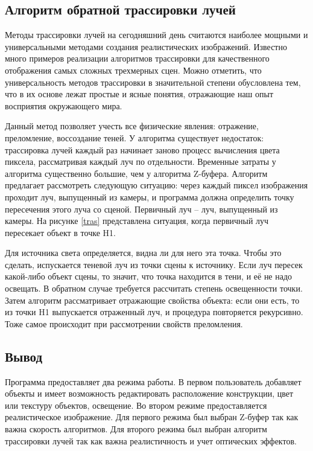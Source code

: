 	\subsection{Алгоритм обратной трассировки лучей}
	Методы трассировки лучей на сегодняшний день считаются наиболее мощными и универсальными методами создания реалистических изображений. Известно много примеров реализации алгоритмов трассировки для качественного отображения самых сложных трехмерных сцен. Можно отметить, что универсальность методов трассировки в значительной степени обусловлена тем, что в их основе лежат простые и ясные понятия, отражающие наш опыт восприятия окружающего мира.
	
	Данный метод позволяет учесть все физические явления: отражение, преломление, воссоздание теней. У алгоритма существует недостаток: трассировка лучей каждый раз начинает заново процесс вычисления цвета пиксела, рассматривая каждый луч по отдельности. Временные затраты у алгоритма существенно большие, чем у алгоритма Z-буфера.
	Алгоритм предлагает рассмотреть следующую ситуацию: через каждый пиксел изображения проходит луч, выпущенный из камеры, и программа должна определить точку пересечения этого луча со сценой. Первичный луч – луч, выпущенный из камеры.
	На рисунке \ref{tras} представлена ситуация, когда первичный луч пересекает объект в точке H1.
	
	Для источника света определяется, видна ли для него эта точка. Чтобы это сделать, испускается теневой луч из точки сцены к источнику. Если луч пересек какой-либо объект сцены, то значит, что точка находится в тени, и её не надо освещать. В обратном случае требуется рассчитать степень освещенности точки. Затем алгоритм рассматривает отражающие свойства объекта: если они есть, то из точки H1 выпускается отраженный луч, и процедура повторяется рекурсивно. Тоже самое происходит при рассмотрении свойств преломления. 
	\subsection{Вывод}
	Программа предоставляет два режима работы. В первом пользователь добавляет объекты и имеет возможность редактировать расположение конструкции, цвет или текстуру объектов, освещение. Во втором режиме предоставляется реалистическое изображение. Для первого режима был выбран Z-буфер так как важна скорость алгоритмов. Для второго режима был выбран алгоритм трассировки лучей так как важна реалистичность и учет оптических эффектов.
	
